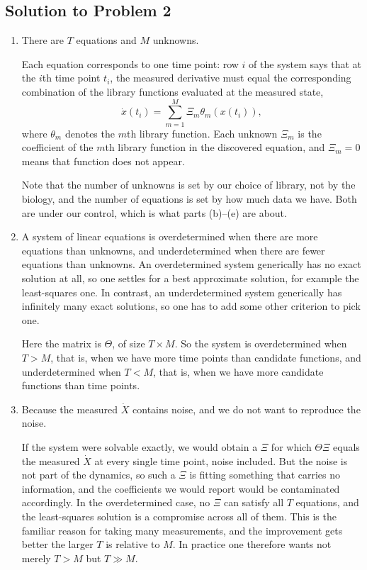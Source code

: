 \documentclass[a4paper,12pt]{article}
\begin{document}
\subsection*{Solution to Problem 2}

\begin{enumerate}[label=(\alph*)]
\item There are $T$ equations and $M$ unknowns.

Each equation corresponds to one time point: row $i$ of the system says that at the $i$th time point $t_i$, the measured derivative must equal the corresponding combination of the library functions evaluated at the measured state,
\[ \dot{x}\!\left( t_i \right) = \sum_{m=1}^{M} \Xi_m \theta_m\!\left( x\!\left( t_i \right) \right) , \]
where $\theta_m$ denotes the $m$th library function. Each unknown $\Xi_m$ is the coefficient of the $m$th library function in the discovered equation, and $\Xi_m=0$ means that function does not appear.

Note that the number of unknowns is set by our choice of library, not by the biology, and the number of equations is set by how much data we have. Both are under our control, which is what parts (b)--(e) are about.

\item A system of linear equations is overdetermined when there are more equations than unknowns, and underdetermined when there are fewer equations than unknowns. An overdetermined system generically has no exact solution at all, so one settles for a best approximate solution, for example the least-squares one. In contrast, an underdetermined system generically has infinitely many exact solutions, so one has to add some other criterion to pick one.

Here the matrix is $\Theta$, of size $T \times M$. So the system is overdetermined when $T>M$, that is, when we have more time points than candidate functions, and underdetermined when $T<M$, that is, when we have more candidate functions than time points.

\item Because the measured $\dot{X}$ contains noise, and we do not want to reproduce the noise.

If the system were solvable exactly, we would obtain a $\Xi$ for which $\Theta\Xi$ equals the measured $\dot{X}$ at every single time point, noise included. But the noise is not part of the dynamics, so such a $\Xi$ is fitting something that carries no information, and the coefficients we would report would be contaminated accordingly. In the overdetermined case, no $\Xi$ can satisfy all $T$ equations, and the least-squares solution is a compromise across all of them. This is the familiar reason for taking many measurements, and the improvement gets better the larger $T$ is relative to $M$. In practice one therefore wants not merely $T>M$ but $T \gg M$.


\end{enumerate}
\end{document}

